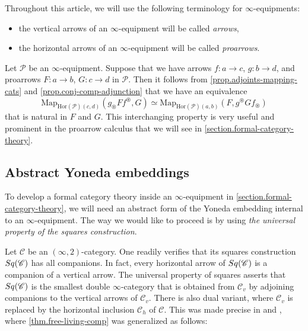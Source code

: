 \documentclass[a4paper, 11pt]{amsart}
\numberwithin{theorem}{section}
\theoremstyle{definition}
\newcommand{\cat}[1]{\textup{#1}}
\newcommand{\map}{\mathrm{Map}}
\newcommand{\C}{\mathscr{C}}
\renewcommand{\P}{\mathscr{P}}
\newcommand{\Hor}{\mathrm{Hor}}
\newcommand{\Sq}{\cat{Sq}}
\begin{document}
	
	\begin{convention}\label{conv.terminology-arrows}
		Throughout this article, we will use the following terminology for $\infty$-equipments:
		\begin{itemize}
		\item the vertical arrows of an $\infty$-equipment will be called \textit{arrows},
		\item the horizontal arrows of an $\infty$-equipment will be called \textit{proarrows}.
		\end{itemize} 
	\end{convention}
	
	\begin{remark}\label{rem.proarrow-interchange}
		Let $\P$ be an $\infty$-equipment. Suppose that we have arrows $f : a \rightarrow c$, $g : b \rightarrow d$,
		and proarrows $F : a \rightarrow b$, $G : c \rightarrow d$ in $\P$. Then it follows from \cref{prop.adjoints-mapping-cats} and \cref{prop.conj-comp-adjunction} that we have an equivalence 
		$$
		\map_{\Hor(\P)(c,d)}(g_\circledast F f^\circledast, G) \simeq \map_{\Hor(\P)(a,b)}(F, g^\circledast Gf_\circledast)
		$$
		that is natural in $F$ and $G$. This interchanging property is very useful and prominent in the proarrow calculus that we will see in \cref{section.formal-category-theory}.
	\end{remark}

\subsection{Abstract Yoneda embeddings}

To develop a formal category theory inside an $\infty$-equipment in \cref{section.formal-category-theory}, we will need an abstract form of the Yoneda embedding internal to an $\infty$-equipment. The way 
we would like to proceed is by using \textit{the universal property of the squares construction}.

Let $\C$ be an $(\infty,2)$-category. One readily verifies that its squares construction $\Sq(\C)$ 
has all companions. In fact, every horizontal arrow of $\Sq(\C)$ is a companion of a vertical arrow. 
The universal property of squares asserts that $\Sq(\C)$ is the smallest double $\infty$-category that is obtained from $\C_v$ by adjoining 
companions to the vertical arrows of $\C_v$. There is also dual variant, where $\C_v$ is replaced by the horizontal inclusion $\C_h$ of $\C$. 
This was made precise in \cite[Theorem 3.14]{GRconj} and \cite[Corollary 3.11]{GRconj}, where \cref{thm.free-living-comp} was generalized as follows:
\end{document}
